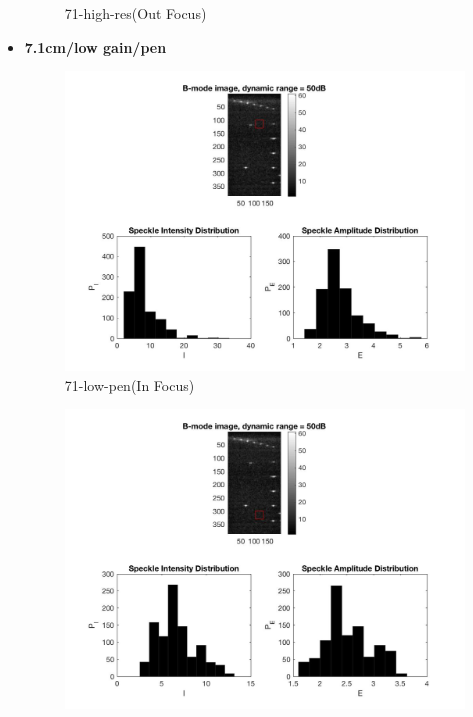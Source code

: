 \documentclass[12pts,a4paper]{article}
\begin{document}
\begin{itemize}
\begin{figure}[h]
    \caption{71-high-res(Out Focus)}
    \label{fig:mesh1}
\end{figure}
\pagebreak
\item{\textbf{7.1cm/low gain/pen}}
\begin{center}
\end{center}
\begin{figure}[h]
    \centering
    \includegraphics[width=1.0\textwidth]{img_hw2/71-low-pen1.jpg}
    \caption{71-low-pen(In Focus)}
    \label{fig:mesh1}
\end{figure}
\pagebreak
\begin{figure}[h]
    \centering
    \includegraphics[width=1.0\textwidth]{img_hw2/71-low-pen2.jpg}

\end{figure}
\end{itemize}
\end{document}
